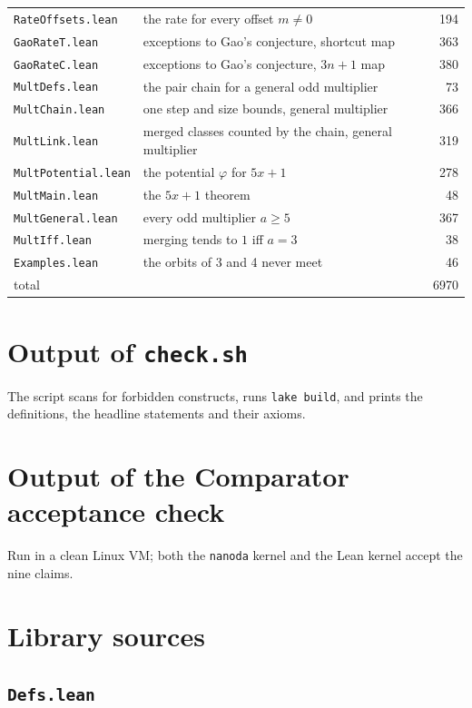 \documentclass[10pt]{article}
\begin{document}
\begin{center}
\begin{tabular}{llr}
\texttt{RateOffsets.lean} & the rate for every offset $m\ne0$ & 194\\
\texttt{GaoRateT.lean} & exceptions to Gao's conjecture, shortcut map & 363\\
\texttt{GaoRateC.lean} & exceptions to Gao's conjecture, $3n+1$ map & 380\\
\texttt{MultDefs.lean} & the pair chain for a general odd multiplier & 73\\
\texttt{MultChain.lean} & one step and size bounds, general multiplier & 366\\
\texttt{MultLink.lean} & merged classes counted by the chain, general multiplier & 319\\
\texttt{MultPotential.lean} & the potential $\varphi$ for $5x+1$ & 278\\
\texttt{MultMain.lean} & the $5x+1$ theorem & 48\\
\texttt{MultGeneral.lean} & every odd multiplier $a\ge5$ & 367\\
\texttt{MultIff.lean} & merging tends to $1$ iff $a=3$ & 38\\
\texttt{Examples.lean} & the orbits of 3 and 4 never meet & 46\\
\midrule total & & 6970\\
\bottomrule\end{tabular}\end{center}

\section{Output of \texttt{check.sh}}
The script scans for forbidden constructs, runs \texttt{lake build}, and prints the definitions, the headline
statements and their axioms.

\section{Output of the Comparator acceptance check}
Run in a clean Linux VM; both the \texttt{nanoda} kernel and the Lean kernel accept the nine claims.

\section{Library sources}
\subsection{\texttt{Defs.lean}}
\end{document}
